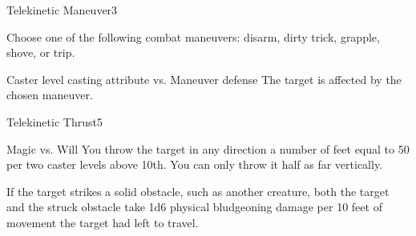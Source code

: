 \begin{spellsection}{Telekinetic Maneuver}{3}
\begin{spellheader}
\end{spellheader}
\begin{spellcontent}
    \begin{spelltargetinginfo}
    \end{spelltargetinginfo}
    \begin{spelleffects}
        \spellspecial Choose one of the following combat maneuvers: disarm, dirty trick, grapple, shove, or trip.
        \begin{spellattack}{Caster level \add casting attribute vs. Maneuver defense}
            \spellsuccess The target is affected by the chosen maneuver.
        \end{spellattack}
    \end{spelleffects}
\end{spellcontent}
\begin{spellfooter}
\end{spellfooter}
\end{spellsection}

\begin{spellsection}{Telekinetic Thrust}{5}
\begin{spellheader}
    \begin{spelltargetinginfo}
    \end{spelltargetinginfo}
\end{spellheader}
\begin{spellcontent}
    \begin{spelleffects}
        \begin{spellattack}{Magic vs. Will}
            \spellsuccess You throw the target in any direction a number of feet equal to 50  per two caster levels above 10th. You can only throw it half as far vertically.

            If the target strikes a solid obstacle, such as another creature, both the target and the struck obstacle take 1d6 physical bludgeoning damage per 10 feet of movement the target had left to travel.
        \end{spellattack}
    \end{spelleffects}
\end{spellcontent}
\begin{spellfooter}
\end{spellfooter}
\end{spellsection}

